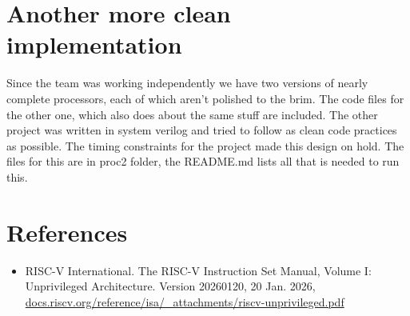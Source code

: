\documentclass[11pt,a4paper]{article}
\begin{document}
\appendix
\section{Another more clean implementation}
Since the team was working independently we have two versions of nearly complete processors, each of which aren't polished to the brim. The code files for the other one, which also does about the same stuff are included. The other project was written in system verilog and tried to follow as clean code practices as possible. The timing constraints for the project made this design on hold. The files for this are in proc2 folder, the README.md lists all that is needed to run this.

\section{References}
\begin{itemize}
	\item RISC-V International. The RISC-V Instruction Set Manual, Volume I: Unprivileged Architecture. Version 20260120, 20 Jan. 2026, \url{docs.riscv.org/reference/isa/\_attachments/riscv-unprivileged.pdf}
\end{itemize}
\end{document}
